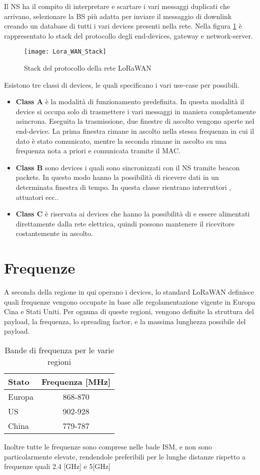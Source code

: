Il NS ha il compito di interpretare e scartare i vari messaggi duplicati che
arrivano, selezionare la BS più adatta per inviare il messaggio di downlink
creando un database di tutti i vari devices presenti nella rete. Nella figura
\ref{fig:stack_lora} è rappresentato lo stack del protocollo degli end-devices,
gateway  e network-server. 

\begin{figure}[h]
\centering 
\texttt{[image: Lora\_WAN\_Stack]}
\caption{Stack del protocollo della rete LoRaWAN}
\label{fig:stack_lora}
\end{figure}

Esistono tre classi di devices, le quali specificano i vari use-case per
possibili.

\begin{itemize}
\item \textbf{Class A} è la modalità di funzionamento predefinita. In questa
modalità il device si occupa solo di trasmettere i vari messaggi in maniera
completamente asincrona. Eseguita la trasmissione, due finestre di ascolto
vengono aperte nel end-device. La prima finestra rimane in ascolto nella stessa
frequenza in cui il dato è stato comunicato, mentre la seconda rimane in ascolto
su una frequenza nota a priori e comunicata tramite il MAC.
\item \textbf{Class B} sono devices i quali sono sincronizzati con il NS tramite
beacon packets. In questo modo hanno la possibilità di ricevere dati in un
determinata finestra di tempo. In questa classe rientrano interruttori ,
attuatori ecc..
\item \textbf{Class C} è riservata ai devices che hanno la possibilità di e
essere alimentati direttamente dalla rete elettrica, quindi possono mantenere il
ricevitore costantemente in ascolto.
\end{itemize}

\section{Frequenze}
A seconda della regione in qui operano i devices, lo standard LoRaWAN definisce
 quali frequenze vengono occupate in base alle regolamentazione vigente in
Europa Cina e Stati Uniti.  Per ognuna di queste regioni, vengono definite 
la struttura del payload, la frequenza, lo spreading factor, e la massima
lunghezza possibile del payload.
\begin{table}[h]
        \centering
        \begin{tabular}{l|c}
                \toprule
                Stato   & Frequenza [MHz] \\
                \hline
                Europa  & 868-870 \\
                US      & 902-928 \\
                China   & 779-787 \\
                \bottomrule
        \end{tabular}
        \caption{Bande di frequenza per le varie regioni}
\end{table}
Inoltre tutte le frequenze sono comprese nelle bade ISM, e non sono
particolarmente elevate, rendendole preferibili per le lunghe distanze rispetto
a frequenze quali 2.4 [GHz] e 5[GHz]
